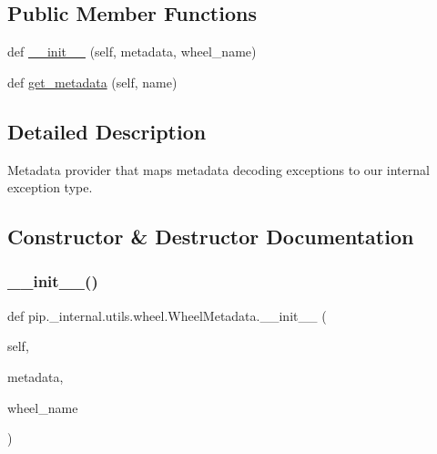 \subsection*{Public Member Functions}
\begin{DoxyCompactItemize}
\item 
def \hyperlink{classpip_1_1__internal_1_1utils_1_1wheel_1_1WheelMetadata_a2a5e958fdb5708d4f1fe82066b708db3}{\+\_\+\+\_\+init\+\_\+\+\_\+} (self, metadata, wheel\+\_\+name)
\item 
def \hyperlink{classpip_1_1__internal_1_1utils_1_1wheel_1_1WheelMetadata_afbb2b63eda7ab55b3df3b0f98469a5c5}{get\+\_\+metadata} (self, name)
\end{DoxyCompactItemize}


\subsection{Detailed Description}
\begin{DoxyVerb}Metadata provider that maps metadata decoding exceptions to our
internal exception type.
\end{DoxyVerb}
 

\subsection{Constructor \& Destructor Documentation}
\mbox{\label{classpip_1_1__internal_1_1utils_1_1wheel_1_1WheelMetadata_a2a5e958fdb5708d4f1fe82066b708db3}} 
\subsubsection{\texorpdfstring{\+\_\+\+\_\+init\+\_\+\+\_\+()}{\_\_init\_\_()}}
{\footnotesize\ttfamily def pip.\+\_\+internal.\+utils.\+wheel.\+Wheel\+Metadata.\+\_\+\+\_\+init\+\_\+\+\_\+ (\begin{DoxyParamCaption}\item[{}]{self,  }\item[{}]{metadata,  }\item[{}]{wheel\+\_\+name }\end{DoxyParamCaption})}



